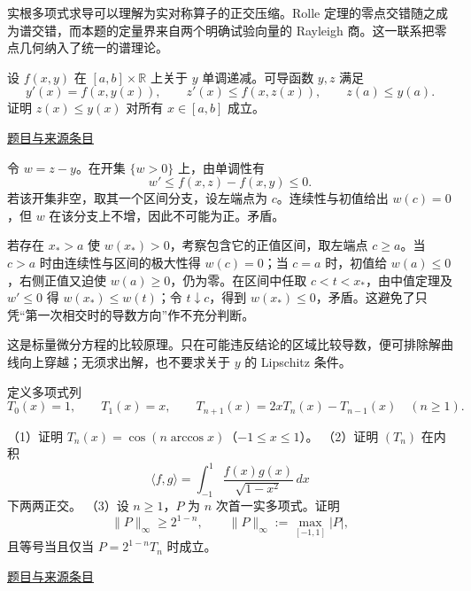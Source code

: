 \documentclass[12pt,fontset=fandol]{ctexart}
\begin{document}
\begin{remark}[方法与条件]实根多项式求导可以理解为实对称算子的正交压缩。Rolle 定理的零点交错随之成为谱交错，而本题的定量界来自两个明确试验向量的 Rayleigh 商。这一联系把零点几何纳入了统一的谱理论。\end{remark}

\begin{example}[来源序号5]\label{ex:fin05-hi:5}\label{pr:fin05-hi:5}

设 $f(x,y)$ 在 $[a,b]\times\mathbb R$ 上关于 $y$ 单调递减。可导函数 $y,z$ 满足
\[
y'(x)=f(x,y(x)),\qquad z'(x)\le f(x,z(x)),\qquad z(a)\le y(a).
\]
证明 $z(x)\le y(x)$ 对所有 $x\in[a,b]$ 成立。

\par\href{https://github.com/lzxcr/cmc-mathematics/blob/64916fa1fdbc3e444a652eca204d5669058ee321/src/problems/finals/05/05.md}{题目与来源条目}

\end{example}

\begin{solve}\label{ans:fin05-hi:5}

令 $w=z-y$。在开集 $\{w>0\}$ 上，由单调性有
\[
w'\le f(x,z)-f(x,y)\le0.
\]
若该开集非空，取其一个区间分支，设左端点为 $c$。连续性与初值给出 $w(c)=0$，但 $w$ 在该分支上不增，因此不可能为正。矛盾。

若存在 $x_*>a$ 使 $w(x_*)>0$，考察包含它的正值区间，取左端点 $c\ge a$。当 $c>a$ 时由连续性与区间的极大性得 $w(c)=0$；当 $c=a$ 时，初值给 $w(a)\le0$，右侧正值又迫使 $w(a)\ge0$，仍为零。在区间中任取 $c<t<x_*$，由中值定理及 $w'\le0$ 得 $w(x_*)\le w(t)$；令 $t\downarrow c$，得到 $w(x_*)\le0$，矛盾。这避免了只凭“第一次相交时的导数方向”作不充分判断。

\end{solve}

\begin{remark}[方法与条件]这是标量微分方程的比较原理。只在可能违反结论的区域比较导数，便可排除解曲线向上穿越；无须求出解，也不要求关于 $y$ 的 Lipschitz 条件。\end{remark}

\begin{example}\label{ex:fin05-hi:11}\label{pr:fin05-hi:11}

定义多项式列
\[
T_0(x)=1,\qquad T_1(x)=x,\qquad
T_{n+1}(x)=2xT_n(x)-T_{n-1}(x)\quad(n\ge1).
\]

（1）证明 $T_n(x)=\cos(n\arccos x)$（$-1\le x\le1$）。
（2）证明 $(T_n)$ 在内积
\[
\langle f,g\rangle=\int_{-1}^1\frac{f(x)g(x)}{\sqrt{1-x^2}}\,dx
\]
下两两正交。
（3）设 $n\ge1$，$P$ 为 $n$ 次首一实多项式。证明
\[
\|P\|_\infty\ge2^{1-n},\qquad
\|P\|_\infty:=\max_{[-1,1]}|P|,
\]
且等号当且仅当 $P=2^{1-n}T_n$ 时成立。

\par\href{https://github.com/lzxcr/cmc-mathematics/blob/64916fa1fdbc3e444a652eca204d5669058ee321/src/problems/finals/05/12.md}{题目与来源条目}

\end{example}
\end{document}
